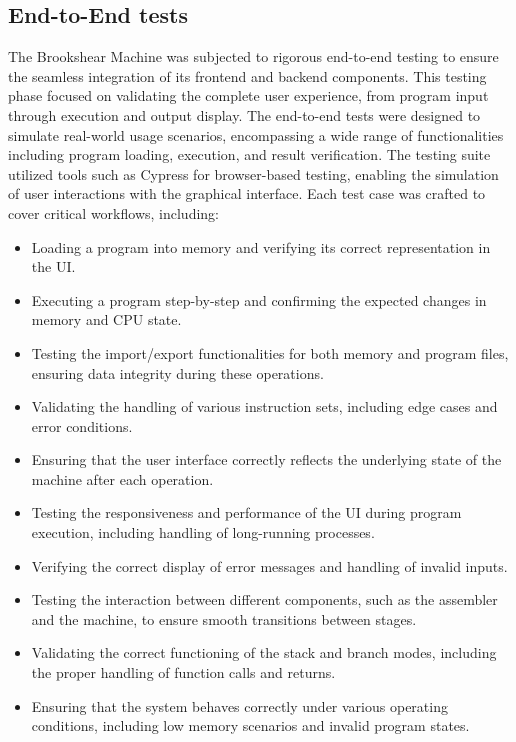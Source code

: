\subsection{End-to-End tests}
The Brookshear Machine was subjected to rigorous end-to-end testing to ensure the seamless integration of its frontend and backend components. This testing phase focused on validating the complete user experience, from program input through execution and output display. The end-to-end tests were designed to simulate real-world usage scenarios, encompassing a wide range of functionalities including program loading, execution, and result verification.
The testing suite utilized tools such as Cypress for browser-based testing, enabling the simulation of user interactions with the graphical interface. Each test case was crafted to cover critical workflows, including:
\begin{itemize}
    \item Loading a program into memory and verifying its correct representation in the UI.
    \item Executing a program step-by-step and confirming the expected changes in memory and CPU state.
    \item Testing the import/export functionalities for both memory and program files, ensuring data integrity during these operations.
    \item Validating the handling of various instruction sets, including edge cases and error conditions.
    \item Ensuring that the user interface correctly reflects the underlying state of the machine after each operation.

    \item Testing the responsiveness and performance of the UI during program execution, including handling of long-running processes.
    \item Verifying the correct display of error messages and handling of invalid inputs.
    \item Testing the interaction between different components, such as the assembler and the machine, to ensure smooth transitions between stages.
    \item Validating the correct functioning of the stack and branch modes, including the proper handling of function calls and returns.
    \item Ensuring that the system behaves correctly under various operating conditions, including low memory scenarios and invalid program states.
\end{itemize}
